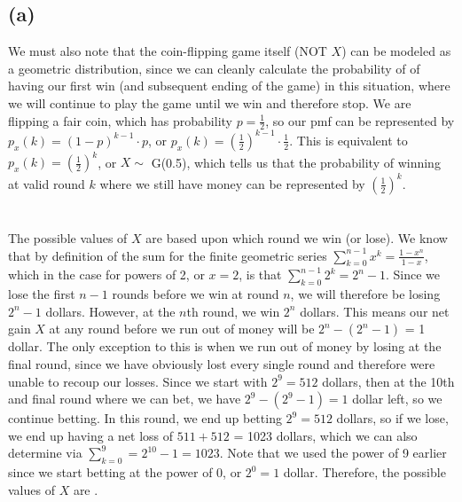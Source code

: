 \documentclass{article}
\begin{document}
{\subsection*{(a)}
We must also note that the coin-flipping game itself (NOT $X$) can be modeled as a geometric distribution, since we can cleanly calculate the probability of of having our first win (and subsequent ending of the game) in this situation, where we will continue to play the game until we win and therefore stop. We are flipping a fair coin, which has probability $p = \frac{1}{2}$, so our pmf can be represented by $p_x(k) = (1-p)^{k-1} \cdot p$, or $p_x(k) = (\frac{1}{2})^{k-1} \cdot \frac{1}{2}$. This is equivalent to $p_x(k) = (\frac{1}{2})^k$, or $X \sim $ G(0.5), which tells us that the probability of winning at valid round $k$ where we still have money can be represented by $(\frac{1}{2})^k$. \\ \\ 
\\ The possible values of $X$ are based upon which round we win (or lose). We know that by definition of the sum for the finite geometric series $\sum_{k=0}^{n-1}x^k = \frac{1 - x^n}{1 - x}$, which in the case for powers of 2, or $x = 2$, is that $\sum_{k=0}^{n-1} 2^k = 2^n - 1$. Since we lose the first $n-1$ rounds before we win at round $n$, we will therefore be losing $2^n - 1$ dollars. However, at the $n$th round, we win $2^n$ dollars. This means our net gain $X$ at any round before we run out of money will be $2^n - (2^n - 1)$ = 1 dollar. The only exception to this is when we run out of money by losing at the final round, since we have obviously lost every single round and therefore were unable to recoup our losses. Since we start with $2^9 = 512$ dollars, then at the 10th and final round where we can bet, we have $2^9 - (2^9 - 1) = 1$ dollar left, so we continue betting. In this round, we end up betting $2^9 = 512$ dollars, so if we lose, we end up having a net loss of $511 + 512$ = 1023 dollars, which we can also determine via $\sum_{k=0}^{9} = 2^10 - 1 = 1023$. Note that we used the power of 9 earlier since we start betting at the power of 0, or $2^0 = 1$ dollar. Therefore, the possible values of $X$ are .

}
\end{document}
